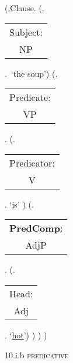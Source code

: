 \documentclass[12pt,letterpaper]{article}
\begin{document}
\begin{figure}
	\begin{center}
		\begin{parsetree}
			(.Clause.
			(.\begin{tabular}{c}Subject:\\NP\end{tabular}.~`the soup')
			(.\begin{tabular}{c}Predicate:\\VP\end{tabular}.
			(.\begin{tabular}{c}Predicator:\\V\end{tabular}. `is' )
			(.\begin{tabular}{c}\textbf{PredComp}:\\AdjP\end{tabular}.  (.\begin{tabular}{c}Head:\\Adj\end{tabular}. `\underline{hot}')
			)
			)
			)
			
			\hfill \break\hfill \break
		\end{parsetree}
		10.i.b \textsc{predicative}
	\end{center}
\end{figure}
\end{document}
